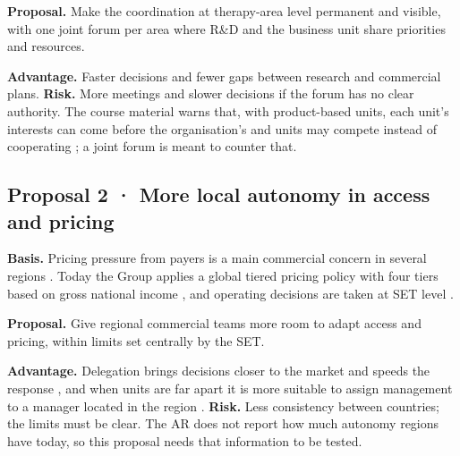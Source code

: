 \textbf{Proposal.} Make the coordination at therapy-area level permanent and visible, with one joint forum per area where R\&D and the business unit share priorities and resources.

\textbf{Advantage.} Faster decisions and fewer gaps between research and commercial plans. \textbf{Risk.} More meetings and slower decisions if the forum has no clear authority. The course material warns that, with product-based units, each unit's interests can come before the organisation's and units may compete instead of cooperating \cite[p.~17]{ORG}; a joint forum is meant to counter that.

\subsection{Proposal 2 · More local autonomy in access and pricing}

\textbf{Basis.} Pricing pressure from payers is a main commercial concern in several regions \cite[p.~32]{AR}. Today the Group applies a global tiered pricing policy with four tiers based on gross national income \cite[p.~41]{AR}, and operating decisions are taken at SET level \cite[p.~147]{AR}.

\textbf{Proposal.} Give regional commercial teams more room to adapt access and pricing, within limits set centrally by the SET.

\textbf{Advantage.} Delegation brings decisions closer to the market and speeds the response \cite[p.~7]{ORG}, and when units are far apart it is more suitable to assign management to a manager located in the region \cite[p.~17]{ORG}. \textbf{Risk.} Less consistency between countries; the limits must be clear. The AR does not report how much autonomy regions have today, so this proposal needs that information to be tested.
